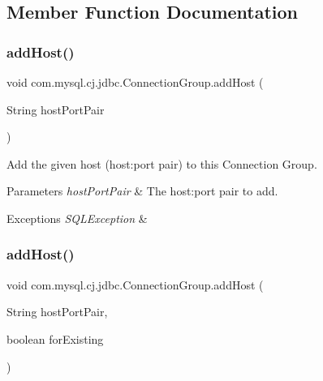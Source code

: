 \subsection{Member Function Documentation}
\mbox{\label{classcom_1_1mysql_1_1cj_1_1jdbc_1_1_connection_group_a609c2dca88c1298e0bc1ec8cf019cfc6}} 
\subsubsection{\texorpdfstring{add\+Host()}{addHost()}\hspace{0.1cm}{\footnotesize\ttfamily [1/2]}}
{\footnotesize\ttfamily void com.\+mysql.\+cj.\+jdbc.\+Connection\+Group.\+add\+Host (\begin{DoxyParamCaption}\item[{String}]{host\+Port\+Pair }\end{DoxyParamCaption})}

Add the given host (host\+:port pair) to this Connection Group.


\begin{DoxyParams}{Parameters}
{\em host\+Port\+Pair} & The host\+:port pair to add. \\
\hline
\end{DoxyParams}

\begin{DoxyExceptions}{Exceptions}
{\em S\+Q\+L\+Exception} & \\
\hline
\end{DoxyExceptions}
\mbox{\label{classcom_1_1mysql_1_1cj_1_1jdbc_1_1_connection_group_a6476527606a8bbf591d41745c3ab32ea}} 
\subsubsection{\texorpdfstring{add\+Host()}{addHost()}\hspace{0.1cm}{\footnotesize\ttfamily [2/2]}}
{\footnotesize\ttfamily void com.\+mysql.\+cj.\+jdbc.\+Connection\+Group.\+add\+Host (\begin{DoxyParamCaption}\item[{String}]{host\+Port\+Pair,  }\item[{boolean}]{for\+Existing }\end{DoxyParamCaption})}

